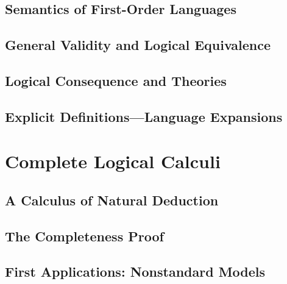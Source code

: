 \subsection{Semantics of First-Order Languages}



\subsection{General Validity and Logical Equivalence}



\subsection{Logical Consequence and Theories}



\subsection{Explicit Definitions---Language Expansions}



\vfill\break

\section{Complete Logical Calculi}

\subsection{A Calculus of Natural Deduction}



\subsection{The Completeness Proof}



\subsection{First Applications: Nonstandard Models}

